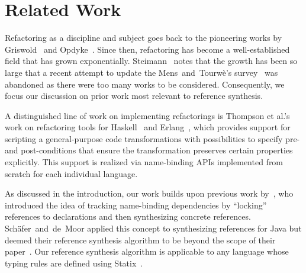 \section{Related Work}
%
\label{sec:related-work}


Refactoring as a discipline and subject goes back to the pioneering works by Griswold~\cite{Griswold:1992:PRA:144627} and Opdyke~\cite{Opdyke1992}.
Since then, refactoring has become a well-established field that has grown exponentially.
Steimann~\cite{Steimann18} notes that the growth has been so large that a recent attempt to update the Mens~and~Tourw\`{e}'s survey~\cite{MensT04} was abandoned as there were too many works to be considered.
Consequently, we focus our discussion on prior work most relevant to reference synthesis.

A distinguished line of work on implementing refactorings is Thompson et al.'s work on refactoring tools for Haskell~\cite{LiRT03,LiTR05} and Erlang~\cite{2455}, which provides support for scripting a general-purpose code transformations with possibilities to specify pre- and post-conditions that ensure the transformation preserves certain properties explicitly.
This support is realized via name-binding APIs implemented from scratch for each individual language.


As discussed in the introduction, our work builds upon previous work by~\citet{EkmanSV08,SchaferEM08,SchaferTST12,SchaferMOOPSLA2010}, who introduced the idea of tracking name-binding dependencies by ``locking'' references to declarations and then synthesizing concrete references.
Sch\"{a}fer~and~de~Moor applied this concept to synthesizing references for Java but deemed their reference synthesis algorithm to be beyond the scope of their paper~\cite[\S{2}]{SchaferMOOPSLA2010}.
Our reference synthesis algorithm is applicable to any language whose typing rules are defined using Statix~\cite{AntwerpenPRV18}.


